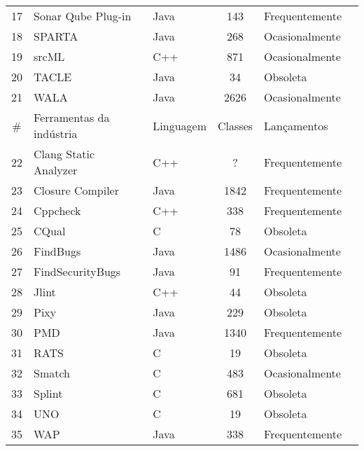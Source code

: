 \begin{table}[H]
\begin{tabular}{| c | l | l | c | l | l |}
    17 & Sonar Qube Plug-in      & Java   & 143   & Frequentemente \\
    18 & SPARTA                  & Java   & 268   & Ocasionalmente \\
    19 & srcML                   & C++    & 871   & Ocasionalmente \\
    20 & TACLE                   & Java   & 34    & Obsoleta       \\
    21 & WALA                    & Java   & 2626  & Ocasionalmente \\
    \hline
    \# & Ferramentas da indústria & Linguagem & Classes & Lançamentos \\
    \hline
    22 & Clang Static Analyzer    & C++   & ?     & Frequentemente \\
    23 & Closure Compiler         & Java  & 1842  & Frequentemente \\
    24 & Cppcheck                 & C++   & 338   & Frequentemente \\
    25 & CQual                    & C     & 78    & Obsoleta       \\
    26 & FindBugs                 & Java  & 1486  & Ocasionalmente \\
    27 & FindSecurityBugs         & Java  & 91    & Frequentemente \\
    28 & Jlint                    & C++   & 44    & Obsoleta       \\
    29 & Pixy                     & Java  & 229   & Obsoleta       \\
    30 & PMD                      & Java  & 1340  & Frequentemente \\
    31 & RATS                     & C     & 19    & Obsoleta       \\
    32 & Smatch                   & C     & 483   & Ocasionalmente \\
    33 & Splint                   & C     & 681   & Obsoleta       \\
    34 & UNO                      & C     & 19    & Obsoleta       \\
    35 & WAP                      & Java  & 338   & Frequentemente \\
    \hline
  \end{tabular}
  \label{total-de-ferramentas}
\end{table}
